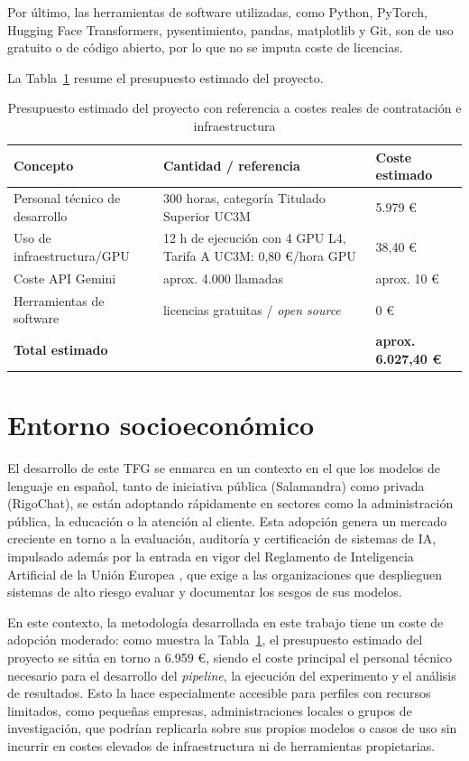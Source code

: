 \documentclass[12pt]{report} %
\renewcommand{\_}{\oldunderscore\allowbreak}
\begin{document}
Por último, las herramientas de software utilizadas, como Python, PyTorch, Hugging Face Transformers, pysentimiento, pandas, matplotlib y Git, son de uso gratuito o de código abierto, por lo que no se imputa coste de licencias.

La Tabla~\ref{tab:presupuesto} resume el presupuesto estimado del proyecto.

\begin{table}[H]
\centering
\footnotesize
\begin{tabular}{p{4cm}p{4.5cm}p{3.5cm}}
\hline
\textbf{Concepto} & \textbf{Cantidad / referencia} & \textbf{Coste estimado} \\
\hline
Personal técnico de desarrollo & 300 horas, categoría Titulado Superior UC3M & 5.979 € \\
\hline
Uso de infraestructura/GPU & 12 h de ejecución con 4 GPU L4, Tarifa A UC3M: 0,80 €/hora GPU & 38,40 € \\
\hline
Coste API Gemini & aprox. 4.000 llamadas & aprox. 10 € \\
\hline
Herramientas de software & licencias gratuitas / \textit{open source} & 0 € \\
\hline
\textbf{Total estimado} & & \textbf{aprox. 6.027,40 €} \\
\hline
\end{tabular}
\caption{Presupuesto estimado del proyecto con referencia a costes reales de contratación e infraestructura}
\label{tab:presupuesto}
\end{table}
\section{Entorno socioeconómico}
El desarrollo de este TFG se enmarca en un contexto en el que los modelos de lenguaje en español, tanto de iniciativa pública (Salamandra) como privada (RigoChat), se están adoptando rápidamente en sectores como la administración pública, la educación o la atención al cliente. Esta adopción genera un mercado creciente en torno a la evaluación, auditoría y certificación de sistemas de IA, impulsado además por la entrada en vigor del Reglamento de Inteligencia Artificial de la Unión Europea \cite{aiact2024}, que exige a las organizaciones que desplieguen sistemas de alto riesgo evaluar y documentar los sesgos de sus modelos.

En este contexto, la metodología desarrollada en este trabajo tiene un coste de adopción moderado: como muestra la Tabla~\ref{tab:presupuesto}, el presupuesto estimado del proyecto se sitúa en torno a 6.959 €, siendo el coste principal el personal técnico necesario para el desarrollo del \textit{pipeline}, la ejecución del experimento y el análisis de resultados. Esto la hace especialmente accesible para perfiles con recursos limitados, como pequeñas empresas, administraciones locales o grupos de investigación, que podrían replicarla sobre sus propios modelos o casos de uso sin incurrir en costes elevados de infraestructura ni de herramientas propietarias.
\end{document}
